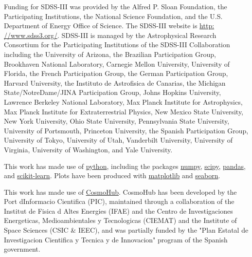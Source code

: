\documentclass{aa}
\numberwithin{equation}{section}
\begin{document}
Funding for SDSS-III was provided by the Alfred P.
Sloan Foundation, the Participating Institutions, the National Science Foundation, and the U.S. Department of
Energy Office of Science. The SDSS-III website is \hyperlink{http:
//www.sdss3.org/}{http:
//www.sdss3.org/}. SDSS-III is managed by the Astrophysical Research Consortium for the Participating Institutions
of the SDSS-III Collaboration including the University of
Arizona, the Brazilian Participation Group, Brookhaven
National Laboratory, Carnegie Mellon University, University of Florida, the French Participation Group, the German Participation Group, Harvard University, the Instituto de Astrofisica de Canarias, the Michigan State/NotreDame/JINA Participation Group, Johns Hopkins University, Lawrence Berkeley National Laboratory, Max Planck
Institute for Astrophysics, Max Planck Institute for Extraterrestrial Physics, New Mexico State University, New
York University, Ohio State University, Pennsylvania State
University, University of Portsmouth, Princeton University,
the Spanish Participation Group, University of Tokyo, University of Utah, Vanderbilt University, University of Virginia, University of Washington, and Yale University.

This work has made use of \hyperlink{www.python.org}{python},
including the packages \hyperlink{www.numpy.org}{numpy}, \hyperlink{www.scipy.org}{scipy}, \hyperlink{https://pandas.pydata.org/}{pandas}, and \hyperlink{https://scikit-learn.org/}{scikit-learn}. 
Plots have been produced with \hyperlink{matplotlib.org}{matplotlib} and \hyperlink{https://seaborn.pydata.org/}{seaborn}.

This work has made use of \hyperlink{cosmohub.pic.es}{CosmoHub}.
CosmoHub has been developed by the Port dInformacio Cientifica (PIC), maintained through a collaboration of the Institut de Fisica d Altes Energies (IFAE) and the Centro de Investigaciones Energeticas, Medioambientales y Tecnologicas (CIEMAT) and the Institute of Space Sciences (CSIC \& IEEC), and was partially funded by the "Plan Estatal de Investigacion Cientifica y Tecnica y de Innovacion" program of the Spanish government.

 
\end{document}
